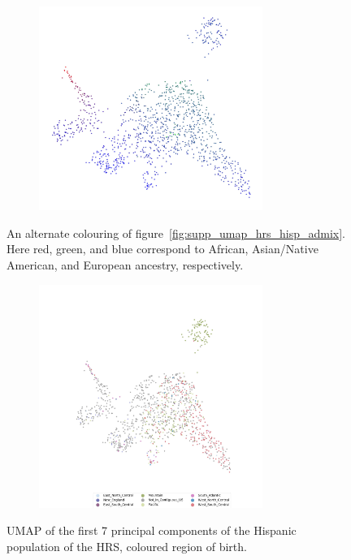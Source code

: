 \documentclass[12pt]{pnas-new}
\begin{document}
\begin{figure}
    \centering
    \begin{subfigure}{\textwidth}
    \includegraphics[width=0.8\textwidth]{images/HRS_1000G_NP1_UMAP_PC7_NC2_NN15_MD05_pca_hrshisp_added1kgp_2018115153245_admix132_hisp.jpeg}
    \end{subfigure}
    \caption{An alternate colouring of figure~\ref{fig:supp_umap_hrs_hisp_admix}. Here red, green, and blue correspond to African, Asian/Native American, and European ancestry, respectively.}
    \label{fig:supp_umap_hrs_hisp_admix_alt}
\end{figure}

\begin{figure}
    \centering
    \begin{subfigure}{\textwidth}
    \includegraphics[width=0.8\textwidth]{images/HRS_1000G_NP1_UMAP_PC7_NC2_NN15_MD05_pca_hrshisp_added1kgp_2018115153245_1kgp_hisp_birthonly.jpeg}
    \end{subfigure}
    \caption{UMAP of the first 7 principal components of the Hispanic population of the HRS, coloured region of birth.}
    \label{fig:supp_umap_hrs_hisp_birth}
\end{figure}
\end{document}
